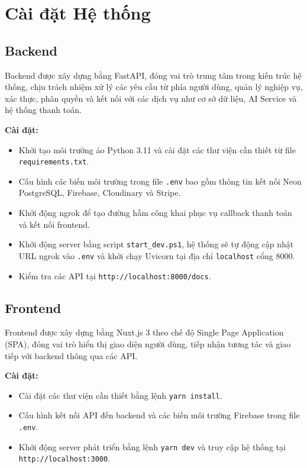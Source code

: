 \section{Cài đặt Hệ thống}

\subsection{Backend}
Backend được xây dựng bằng FastAPI, đóng vai trò trung tâm trong 
kiến trúc hệ thống, chịu trách nhiệm xử lý các yêu cầu từ phía 
người dùng, quản lý nghiệp vụ, xác thực, phân quyền và kết nối 
với các dịch vụ như cơ sở dữ liệu, AI Service và hệ thống 
thanh toán.

\textbf{Cài đặt:}
\begin{itemize}[noitemsep]
    \item Khởi tạo môi trường ảo Python 3.11 và cài đặt các thư 
    viện cần thiết từ file \texttt{requirements.txt}.
    \item Cấu hình các biến môi trường trong file \texttt{.env} 
    bao gồm thông tin kết nối Neon PostgreSQL, Firebase, 
    Cloudinary và Stripe.
    \item Khởi động ngrok để tạo đường hầm công khai phục vụ 
    callback thanh toán và kết nối frontend.
    \item Khởi động server bằng script \texttt{start\_dev.ps1}, 
    hệ thống sẽ tự động cập nhật URL ngrok vào \texttt{.env} 
    và khởi chạy Uvicorn tại địa chỉ \texttt{localhost} cổng 8000.
    \item Kiểm tra các API tại \texttt{http://localhost:8000/docs}.
\end{itemize}

\subsection{Frontend}
Frontend được xây dựng bằng Nuxt.js 3 theo chế độ Single Page 
Application (SPA), đóng vai trò hiển thị giao diện người dùng, 
tiếp nhận tương tác và giao tiếp với backend thông qua các API.

\textbf{Cài đặt:}
\begin{itemize}[noitemsep]
    \item Cài đặt các thư viện cần thiết bằng lệnh 
    \texttt{yarn install}.
    \item Cấu hình kết nối API đến backend và các biến môi 
    trường Firebase trong file \texttt{.env}.
    \item Khởi động server phát triển bằng lệnh \texttt{yarn dev} 
    và truy cập hệ thống tại \texttt{http://localhost:3000}.
\end{itemize}

